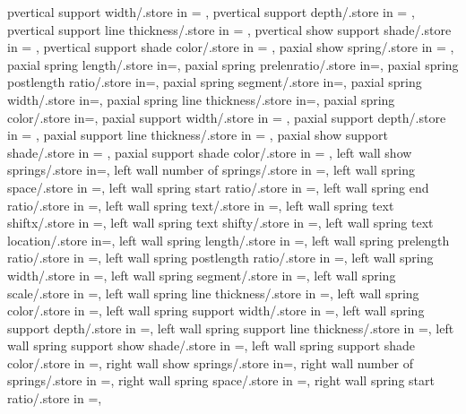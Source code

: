 {  pvertical support width/.store in = \pversuppwidth,
  pvertical support depth/.store in = \pversuppdepth,
  pvertical support line thickness/.store in = \pversupplinethk,
  pvertical show support shade/.store in = \pvershowsuppshade,
  pvertical support shade color/.store in = \pversuppshadecol,
  paxial show spring/.store in = \showpaxialspring,
  paxial spring length/.store in=\paxialspringlength,
  paxial spring prelenratio/.store in=\paxialspringprelenratio,
  paxial spring postlength ratio/.store in=\paxialspringpostlenratio,
  paxial spring segment/.store in=\paxialspringsegm,
  paxial spring width/.store in=\paxialspringwidth,
  paxial spring line thickness/.store in=\paxialspringlinethk,
  paxial spring color/.store in=\paxialspringcolor,
  paxial support width/.store in = \paxialsuppwidth,
  paxial support depth/.store in = \paxialsuppdepth,
  paxial support line thickness/.store in = \paxialsupplinethk,
  paxial show support shade/.store in = \paxialshowsuppshade,
  paxial support shade color/.store in = \paxialsuppshadecol,
  left wall show springs/.store in=\leftwshowsprings,
  left wall number of springs/.store in =\leftwspringnumber,
  left wall spring space/.store in =\leftwspringspace,
  left wall spring start ratio/.store in =\leftwspringstartratio,
  left wall spring end ratio/.store in =\leftwspringendratio,
  left wall spring text/.store in =\leftwspringtext,
  left wall spring text shiftx/.store in =\leftwtextshiftx,
  left wall spring text shifty/.store in =\leftwtextshifty,
  left wall spring text location/.store in=\leftwspringtextloc,
  left wall spring length/.store in =\leftwspringlength,
  left wall spring prelength ratio/.store in =\leftwprelenratio,
  left wall spring postlength ratio/.store in =\leftwpostlenratio,
  left wall spring width/.store in =\leftwampl,
  left wall spring segment/.store in =\leftwsegm,
  left wall spring scale/.store in =\leftwspringscale,
  left wall spring line thickness/.store in =\leftwspringthk,
  left wall spring color/.store in =\leftwspringcolor,
  left wall spring support width/.store in =\leftwsuppwidth,
  left wall spring support depth/.store in =\leftwsuppdepth,
  left wall spring support line thickness/.store in =\leftwsupplinethk,
  left wall spring support show shade/.store in =\leftwshowsuppshade,
  left wall spring support shade color/.store in =\leftwsuppshadecol,
  right wall show springs/.store in=\rightwshowsprings,
  right wall number of springs/.store in =\rightwspringnumber,
  right wall spring space/.store in =\rightwspringspace,
  right wall spring start ratio/.store in =\rightwspringstartratio,
}
